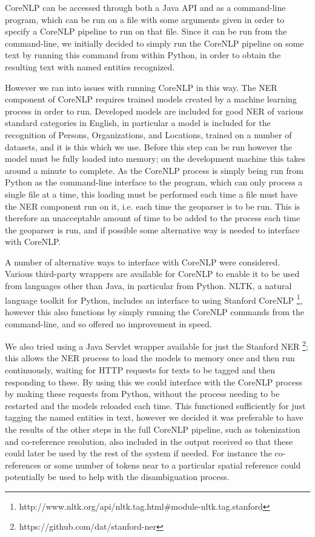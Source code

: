 \documentclass[12pt, a4paper]{report}
\begin{document}
CoreNLP can be accessed through both a Java API and as a command-line program, which can be run on a file with some arguments given in order to specify a CoreNLP pipeline to run on that file. Since it can be run from the command-line, we initially decided to simply run the CoreNLP pipeline on some text by running this command from within Python, in order to obtain the resulting text with named entities recognized.

However we ran into issues with running CoreNLP in this way. The NER component of CoreNLP requires trained models created by a machine learning process in order to run. Developed models are included for good NER of various standard categories in English, in particular a model is included for the recognition of Persons, Organizations, and Locations, trained on a number of datasets, and it is this which we use. Before this step can be run however the model must be fully loaded into memory; on the development machine this takes around a minute to complete. As the CoreNLP process is simply being run from Python as the command-line interface to the program, which can only process a single file at a time, this loading must be performed each time a file must have the NER component run on it, i.e. each time the geoparser is to be run. This is therefore an unacceptable amount of time to be added to the process each time the geoparser is run, and if possible some alternative way is needed to interface with CoreNLP.

A number of alternative ways to interface with CoreNLP were considered. Various third-party wrappers are available for CoreNLP to enable it to be used from languages other than Java, in particular from Python. NLTK, a natural language toolkit for Python, includes an interface to using Stanford CoreNLP \footnote{http://www.nltk.org/api/nltk.tag.html\#module-nltk.tag.stanford}, however this also functions by simply running the CoreNLP commands from the command-line, and so offered no improvement in speed.

We also tried using a Java Servlet wrapper available for just the Stanford NER \footnote{https://github.com/dat/stanford-ner}; this allows the NER process to load the models to memory once and then run continuously, waiting for HTTP requests for texts to be tagged and then responding to these. By using this we could interface with the CoreNLP process by making these requests from Python, without the process needing to be restarted and the models reloaded each time. This functioned sufficiently for just tagging the named entities in text, however we decided it was preferable to have the results of the other steps in the full CoreNLP pipeline, such as tokenization and co-reference resolution, also included in the output received so that these could later be used by the rest of the system if needed. For instance the co-references or some number of tokens near to a particular spatial reference could potentially be used to help with the disambiguation process.
\end{document}
